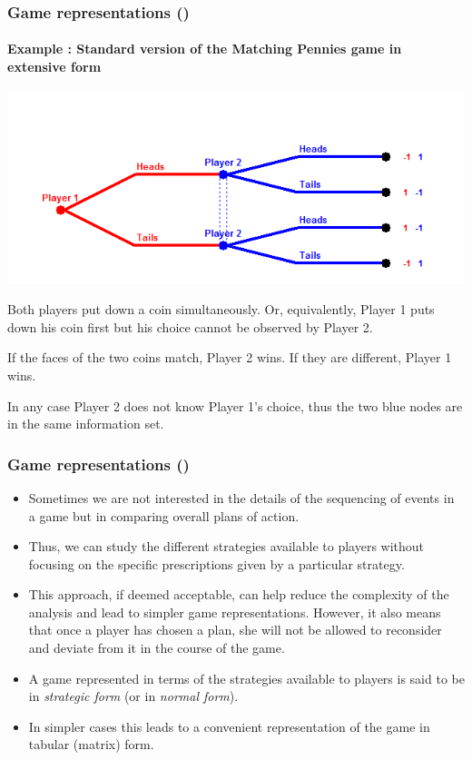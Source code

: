 \documentclass[10pt]{beamer}
\theoremstyle{definition}
\begin{document}
\begin{frame}[fragile]
\frametitle{Game representations ()}
\framesubtitle{Example : Standard version of the Matching Pennies game in extensive form}
\begin{center}
\includegraphics[width=0.8\linewidth]{Standard_Matching_Pennies}
\end{center}

\begin{itemize}{\small
\item Both players put down a coin simultaneously. Or, equivalently, Player 1 puts down his coin first but his choice cannot be observed by Player 2.
\item If the faces of the two coins match, Player 2 wins. If they are different, Player 1 wins.
\item In any case Player 2 does not know Player 1's choice, thus the two blue nodes are in the same information set.
}
\end{itemize}
\end{frame}



\begin{frame}[fragile]
\frametitle{Game representations ()}
\begin{itemize}\itemsep1em
\item Sometimes we are not interested in the details of the sequencing of events in a game but in comparing overall plans of action.
\item Thus, we can study the different strategies available to players without focusing on the specific prescriptions given by a particular strategy.
\item This approach, if deemed acceptable, can help reduce the complexity of the analysis and lead to simpler game representations. However, it also means that once a player has chosen a plan, she will not be allowed to reconsider and deviate from it in the course of the game.
\item A game represented in terms of the strategies available to players is said to be in \emph{strategic form} (or in \emph{normal form}).
\item In simpler cases this leads to a convenient representation of the game in tabular (matrix) form.
\end{itemize}
\end{frame}
\end{document}
